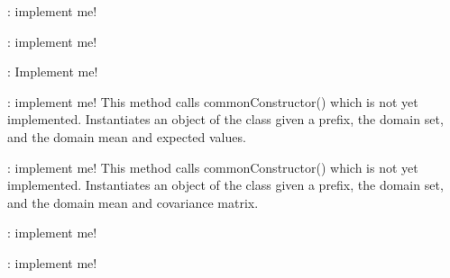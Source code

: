 \begin{DoxyRefList}
\item[\label{todo__todo000022}%
\hypertarget{todo__todo000022}{}%
Member \hyperlink{class_q_u_e_s_o_1_1_gaussian_vector_cdf_a9afe1cc5333789fb73974a0d17e7fc0c}{Q\-U\-E\-S\-O\-:\-:Gaussian\-Vector\-Cdf$<$ V, M $>$\-:\-:print} (std\-::ostream \&os) const ]\-: implement me!  
\item[\label{todo__todo000021}%
\hypertarget{todo__todo000021}{}%
Member \hyperlink{class_q_u_e_s_o_1_1_gaussian_vector_cdf_a369ca9e3dea35ddb4799a89db47b12d6}{Q\-U\-E\-S\-O\-:\-:Gaussian\-Vector\-Cdf$<$ V, M $>$\-:\-:values} (const V \&param\-Values, V \&cdf\-Vec) const ]\-: implement me!  
\item[\label{todo__todo000023}%
\hypertarget{todo__todo000023}{}%
Class \hyperlink{class_q_u_e_s_o_1_1_gaussian_vector_mdf}{Q\-U\-E\-S\-O\-:\-:Gaussian\-Vector\-Mdf$<$ V, M $>$} ]\-: Implement me!  
\item[\label{todo__todo000024}%
\hypertarget{todo__todo000024}{}%
Member \hyperlink{class_q_u_e_s_o_1_1_gaussian_vector_mdf_a015d3be8f9b52f811cd643294b6f1239}{Q\-U\-E\-S\-O\-:\-:Gaussian\-Vector\-Mdf$<$ V, M $>$\-:\-:Gaussian\-Vector\-Mdf} (const char $\ast$prefix, const Vector\-Set$<$ V, M $>$ \&domain\-Set, const V \&domain\-Expected\-Values, const V \&domain\-Variance\-Values)]\-: implement me! This method calls common\-Constructor() which is not yet implemented. Instantiates an object of the class given a prefix, the domain set, and the domain mean and expected values.  
\item[\label{todo__todo000025}%
\hypertarget{todo__todo000025}{}%
Member \hyperlink{class_q_u_e_s_o_1_1_gaussian_vector_mdf_ae378d6cb9cf8db82e72744ca38f385e5}{Q\-U\-E\-S\-O\-:\-:Gaussian\-Vector\-Mdf$<$ V, M $>$\-:\-:Gaussian\-Vector\-Mdf} (const char $\ast$prefix, const Vector\-Set$<$ V, M $>$ \&domain\-Set, const V \&domain\-Expected\-Values, const M \&cov\-Matrix)]\-: implement me! This method calls common\-Constructor() which is not yet implemented. Instantiates an object of the class given a prefix, the domain set, and the domain mean and covariance matrix.  
\item[\label{todo__todo000027}%
\hypertarget{todo__todo000027}{}%
Member \hyperlink{class_q_u_e_s_o_1_1_gaussian_vector_mdf_aae69a5b89169542b47de4b0dfa2e60e5}{Q\-U\-E\-S\-O\-:\-:Gaussian\-Vector\-Mdf$<$ V, M $>$\-:\-:print} (std\-::ostream \&os) const ]\-: implement me!  
\item[\label{todo__todo000026}%
\hypertarget{todo__todo000026}{}%
Member \hyperlink{class_q_u_e_s_o_1_1_gaussian_vector_mdf_a4b842d80858175ead566bd57aa334c0a}{Q\-U\-E\-S\-O\-:\-:Gaussian\-Vector\-Mdf$<$ V, M $>$\-:\-:values} (const V \&param\-Values, V \&mdf\-Vec) const ]\-: implement me!  

\end{DoxyRefList}
